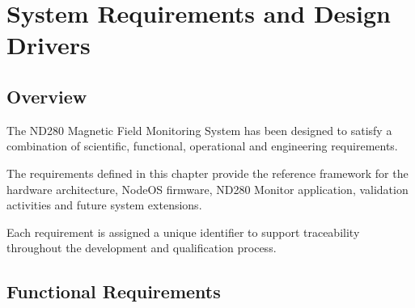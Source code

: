 \chapter{System Requirements and Design Drivers}

 
\section{Overview}

The ND280 Magnetic Field Monitoring System has been designed to satisfy a combination of scientific, functional, operational and engineering requirements.

The requirements defined in this chapter provide the reference framework for the hardware architecture, NodeOS firmware, ND280 Monitor application, validation activities and future system extensions.

Each requirement is assigned a unique identifier to support traceability throughout the development and qualification process.

\section{Functional Requirements}


